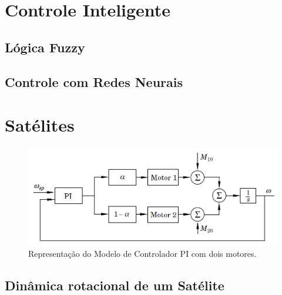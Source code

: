 \section{Controle Inteligente}

\subsection{Lógica Fuzzy}

\subsection{Controle com Redes Neurais}  %

\section{Satélites}

\begin{figure}[htb]
  \caption{Representação do Modelo de Controlador PI com dois motores.}
  \begin{center}
      \includegraphics[scale=0.65]{img/pi_twomotors_astrom_p308}
  \end{center}
  \label{fig:pi_twomotors_astrom_p308}
\end{figure}

\subsection{Dinâmica rotacional de um Satélite}

